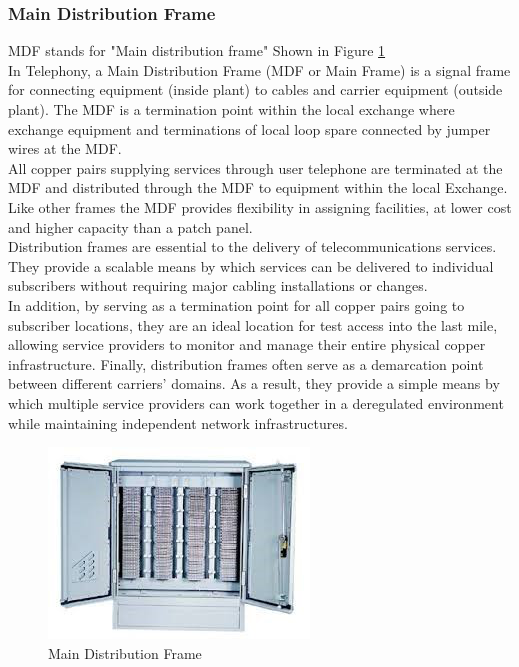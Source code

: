 \documentclass[12pt,fleqn]{book} %
\begin{document}
\subsubsection{Main Distribution Frame}
MDF stands for "Main distribution frame" Shown in Figure \ref{fig:hamdy 51}
\\ In Telephony, a Main Distribution Frame (MDF or Main Frame) is a signal frame for connecting equipment (inside plant) to cables and carrier equipment (outside plant). The MDF is a termination point within the local exchange where exchange equipment and terminations of local loop spare connected by jumper wires at the MDF.
\\ All copper pairs supplying services through user telephone are terminated at the MDF and distributed through the MDF to equipment within the local Exchange.
\\ Like other frames the MDF provides flexibility in assigning facilities, at lower cost and higher capacity than a patch panel.
\\ Distribution frames are essential to the delivery of telecommunications services. They provide a scalable means by which services can be delivered to individual subscribers without requiring major cabling installations or changes.
\\ In addition, by serving as a termination point for all copper pairs going to subscriber locations, they are an ideal location for test access into the last mile, allowing service providers to monitor and manage their entire physical copper infrastructure. Finally, distribution frames often serve as a demarcation point between different carriers' domains. As a result, they provide a simple means by which multiple service providers can work together in a deregulated environment while maintaining independent network infrastructures.
\begin{figure}[!h]
    \centering
    \includegraphics[width=0.5\linewidth]{hamdy 51.png}
    \caption{Main Distribution Frame}
    \label{fig:hamdy 51}
    \end{figure}
\end{document}
